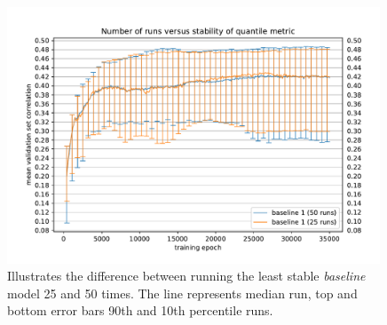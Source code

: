 \begin{figure}[H]
    \centering
    \includegraphics[width=0.99\textwidth]{../figures/04_runs_number}
    \caption[Impact of 25 vs 50 runs]{Illustrates the difference between running the least stable \textit{baseline} model 25 and 50 times. The line represents median run, top and bottom error bars 90th and 10th percentile runs.}
    \label{fig:4.2}
\end{figure}
